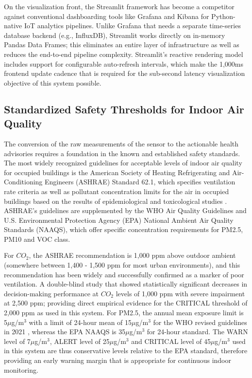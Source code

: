 \documentclass[conference]{IEEEtran}
\begin{document}
On the visualization front, the Streamlit framework has become a competitor against conventional dashboarding tools like Grafana and Kibana for Python-native IoT analytics pipelines. Unlike Grafana that needs a separate time-series database backend (e.g., InfluxDB), Streamlit works directly on in-memory Pandas Data Frames; this eliminates an entire layer of infrastructure as well as reduces the end-to-end pipeline complexity. Streamlit's reactive rendering model includes support for configurable auto-refresh intervals, which make the 1,000ms frontend update cadence that is required for the sub-second latency visualization objective of this system possible.


\subsection{Standardized Safety Thresholds for Indoor Air Quality}

The conversion of the raw measurements of the sensor to the actionable health advisories requires a foundation in the known and established safety standards. The most widely recognized guidelines for acceptable levels of indoor air quality for occupied buildings is the American Society of Heating Refrigerating and Air-Conditioning Engineers (ASHRAE) Standard 62.1, which specifies ventilation rate criteria as well as pollutant concentration limits for the air in occupied buildings based on the results of epidemiological and toxicological studies \cite{b17}. ASHRAE's guidelines are supplemented by the WHO Air Quality Guidelines and U.S. Environmental Protection Agency (EPA) National Ambient Air Quality Standards (NAAQS), which offer specific concentration requirements for PM2.5, PM10 and VOC class.

For $CO_2$, the ASHRAE recommendation is 1,000 ppm above outdoor ambient (somewhere between 1,400 - 1,500 ppm for most urban environments), and this recommendation has been widely and successfully confirmed as a marker of poor ventilation. A double-blind study that showed statistically significant decreases in decision-making performance at $CO_2$ levels of 1,000 ppm with severe impairment at 2,500 ppm; providing direct empirical evidence for the CRITICAL threshold of 2,000 ppm as used in this system. For PM2.5, the annual mean exposure limit is 5$\mu$g/m$^3$ with a limit of 24-hour mean of 15$\mu$g/m$^3$ for the WHO revised guidelines in 2021 \cite{b18}, whereas the EPA NAAQS is 35$\mu$g/m$^3$ \cite{b18} for 24-hour standard. The WARN level of 7$\mu$g/m$^3$, ALERT level of 25$\mu$g/m$^3$ and CRITICAL level of 45$\mu$g/m$^3$ used in this system are thus conservative levels relative to the EPA standard, therefore providing an early warning margin that is appropriate for continuous indoor monitoring.
\end{document}
